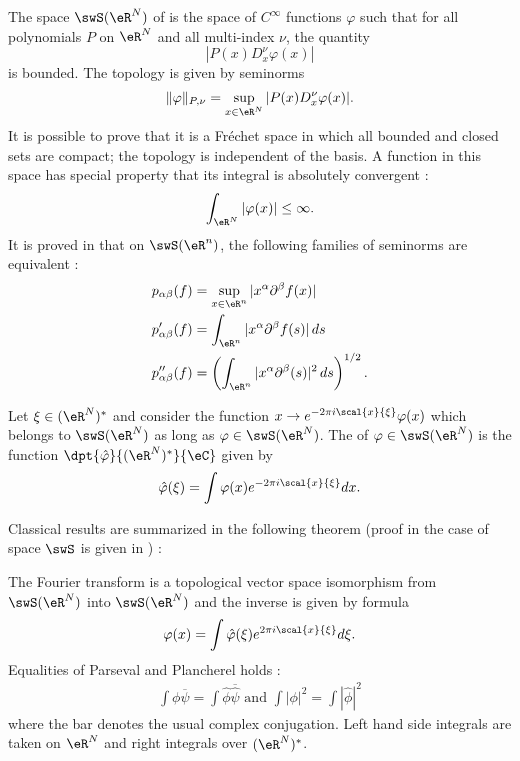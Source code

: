 The space $\swS(\eR^N)$\label{not_swS} of  is the space of $ C^{\infty}$ functions $\varphi$ such that for all polynomials $P$ on $\eR^N$ and all multi-index $\nu$, the quantity
\begin{equation}
  | P(x)D_x^{\nu}\varphi(x) |
\end{equation}
is bounded.  The topology is given by seminorms
\begin{equation}
  \| \varphi \|_{P,\nu}=\sup_{x\in\eR^N}| P(x)D_x^{\nu}\varphi(x) |.
\end{equation}
It is possible to prove that it is a Fréchet space in which all bounded and closed sets are compact; the topology is independent of the basis. A function in this space has special property that its integral is absolutely convergent :
\[ 
  \int_{\eR^N}| \varphi(x) |\leq \infty.
\]
It is proved in \cite{Kirillov} that on $\swS(\eR^n)$, the following families of seminorms are equivalent :
\begin{subequations}
\begin{align}
  p_{\alpha\beta}(f)&=\sup_{x\in\eR^n}| x^{\alpha}\partial^{\beta}f(x) |\\
 p'_{\alpha\beta}(f)&=\int_{\eR^n}| x^{\alpha}\partial^{\beta}f(s) |\,ds\\
p''_{\alpha\beta}(f)&=\left( \int_{\eR^n}| x^{\alpha}\partial^{\beta}(s) |^2\,ds \right)^{1/2}.
\end{align}
\end{subequations}

Let $\xi\in(\eR^N)^*$ and consider the function  $x\to e^{-2\pi i\scal{x}{\xi}}\varphi(x)$
which belongs to $\swS(\eR^N)$ as long as $\varphi\in\swS(\eR^N)$. The  of $\varphi\in\swS(\eR^N)$ is the function $\dpt{\hat\varphi}{(\eR^N)^*}{\eC}$ given by
\begin{equation}
\hat\varphi(\xi)=\int \varphi(x)e^{-2\pi i\scal{x}{\xi}}dx.
\end{equation}

Classical results are summarized in the following theorem (proof in the case of space $\swS$ is given in \cite{Treves}) :

\begin{theorem}
The Fourier transform is a topological vector space isomorphism from $\swS(\eR^N)$ into $\swS(\eR^N)$ and the inverse is given by formula
\[ 
  \varphi(x)=\int \hat\varphi(\xi)e^{2\pi i\scal{x}{\xi}}d\xi.
\]
Equalities of Parseval and Plancherel holds :
\begin{align}
  \int \phi\overline{\psi}=\int \hat\phi\overline{\hat\psi}\textrm{ and }
\int| \phi |^2=\int| \hat\phi |^2
\end{align}
where the bar denotes the usual complex conjugation. Left hand side integrals are taken on $\eR^N$ and right integrals over $(\eR^N)^*$.
\end{theorem}

